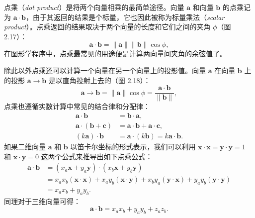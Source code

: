 
点乘（\textit{dot product}）是将两个向量相乘的最简单途径。向量 $\mathbf{a}$ 和向量 $\mathbf{b}$ 的点乘记为  $\mathbf{a} \cdot \mathbf{b}$，由于其返回的结果是个标量，它也因此被称为标量乘法（\textit{scalar product}）。点乘返回的结果取决于两个向量的长度和它们之间的夹角 $\phi$（图 2.17）：
\begin{equation}
  \mathbf{a} \cdot \mathbf{b} = \|\mathbf{a}\| \|\mathbf{b}\| \cos\phi,
\end{equation}
在图形学程序中，点乘最常见的用途便是计算两向量间夹角的余弦值了。

除此以外点乘还可以计算一个向量在另一个向量上的投影值。向量 $\mathbf{a}$ 在向量 $\mathbf{b}$ 上的投影 $\mathbf{a} \to \mathbf{b}$ 是以直角投射上去的（图 2.18）：
\begin{equation}
  \mathbf{a} \to \mathbf{b} = \|\mathbf{a}\| \cos\phi = \frac{\mathbf{a} \cdot \mathbf{b}}{\|\mathbf{b}\|},
\end{equation}
点乘也遵循实数计算中常见的结合律和分配律：
\begin{equation}
  \begin{aligned}
    \mathbf{a} \cdot \mathbf{b}                & = \mathbf{b} \cdot \mathbf{a},                                   \\
    \mathbf{a} \cdot (\mathbf{b} + \mathbf{c}) & = \mathbf{a} \cdot \mathbf{b} + \mathbf{a} \cdot \mathbf{c},     \\
    (k\mathbf{a}) \cdot \mathbf{b}             & = \mathbf{a} \cdot (k\mathbf{b}) = k\mathbf{a} \cdot \mathbf{b}.
  \end{aligned}
\end{equation}
如果二维向量 $\mathbf{a}$ 和 $\mathbf{b}$ 以笛卡尔坐标的形式表示，我们可以利用 $\mathbf{x} \cdot \mathbf{x} = \mathbf{y} \cdot \mathbf{y} = 1$ 和 $\mathbf{x} \cdot \mathbf{y} = 0$ 这两个公式来推导出如下点乘公式：
\[
  \begin{aligned}
    \mathbf{a} \cdot \mathbf{b} & = (x_a\mathbf{x}+y_a\mathbf{y}) \cdot (x_b\mathbf{x}+y_b\mathbf{y})                                                                            \\
                                & =x_ax_b(\mathbf{x}\cdot\mathbf{x}) + x_ay_b(\mathbf{x}\cdot\mathbf{y}) + x_by_a(\mathbf{y}\cdot\mathbf{x}) + y_ay_b(\mathbf{y}\cdot\mathbf{y}) \\
                                & = x_ax_b + y_ay_b.
  \end{aligned}
\]
同理对于三维向量可得：
\[
  \mathbf{a} \cdot \mathbf{b} = x_ax_b + y_ay_b + z_az_b.
\]

